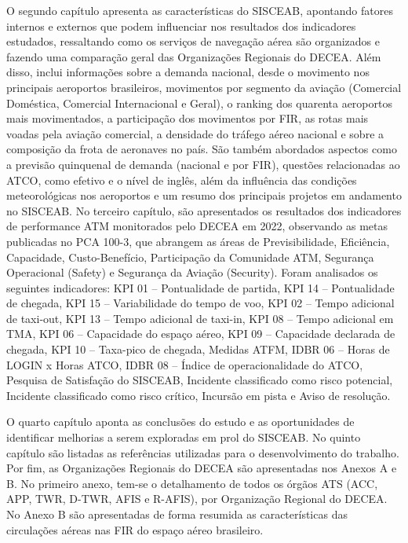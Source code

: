 \documentclass[
]{book}
\theoremstyle{definition}
\theoremstyle{definition}
\theoremstyle{definition}
\theoremstyle{definition}
\theoremstyle{remark}
\begin{document}
O segundo capítulo apresenta as características do SISCEAB, apontando fatores internos e externos que podem influenciar nos resultados dos indicadores estudados, ressaltando como os serviços de navegação aérea são organizados e fazendo uma comparação geral das Organizações Regionais do DECEA. Além disso, inclui informações sobre a demanda nacional, desde o movimento nos principais aeroportos brasileiros, movimentos por segmento da aviação (Comercial Doméstica, Comercial Internacional e Geral), o ranking dos quarenta aeroportos mais movimentados, a participação dos movimentos por FIR, as rotas mais voadas pela aviação comercial, a densidade do tráfego aéreo nacional e sobre a composição da frota de aeronaves no país. São também abordados aspectos como a previsão quinquenal de demanda (nacional e por FIR), questões relacionadas ao ATCO, como efetivo e o nível de inglês, além da influência das condições meteorológicas nos aeroportos e um resumo dos principais projetos em andamento no SISCEAB.
No terceiro capítulo, são apresentados os resultados dos indicadores de performance ATM monitorados pelo DECEA em 2022, observando as metas publicadas no PCA 100-3, que abrangem as áreas de Previsibilidade, Eficiência, Capacidade, Custo-Benefício, Participação da Comunidade ATM, Segurança Operacional (Safety) e Segurança da Aviação (Security). Foram analisados os seguintes indicadores: KPI 01 -- Pontualidade de partida, KPI 14 -- Pontualidade de chegada, KPI 15 -- Variabilidade do tempo de voo, KPI 02 -- Tempo adicional de taxi-out, KPI 13 -- Tempo adicional de taxi-in, KPI 08 -- Tempo adicional em TMA, KPI 06 -- Capacidade do espaço aéreo, KPI 09 -- Capacidade declarada de chegada, KPI 10 -- Taxa-pico de chegada, Medidas ATFM, IDBR 06 -- Horas de LOGIN x Horas ATCO, IDBR 08 -- Índice de operacionalidade do ATCO, Pesquisa de Satisfação do SISCEAB, Incidente classificado como risco potencial, Incidente classificado como risco crítico, Incursão em pista e Aviso de resolução.

O quarto capítulo aponta as conclusões do estudo e as oportunidades de identificar melhorias a serem exploradas em prol do SISCEAB. No quinto capítulo são listadas as referências utilizadas para o desenvolvimento do trabalho.
Por fim, as Organizações Regionais do DECEA são apresentadas nos Anexos A e B. No primeiro anexo, tem-se o detalhamento de todos os órgãos ATS (ACC, APP, TWR, D-TWR, AFIS e R-AFIS), por Organização Regional do DECEA. No Anexo B são apresentadas de forma resumida as características das circulações aéreas nas FIR do espaço aéreo brasileiro.
\end{document}
